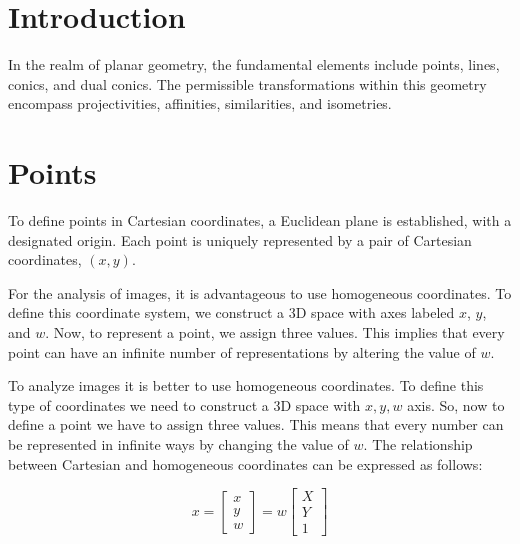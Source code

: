\documentclass[12pt, a4paper]{report}
\begin{document}
    \section{Introduction}
    In the realm of planar geometry, the fundamental elements include points, lines, conics, and dual conics. 
    The permissible transformations within this geometry encompass projectivities, affinities, similarities, and isometries.

    \section{Points}
    To define points in Cartesian coordinates, a Euclidean plane is established, with a designated origin. 
    Each point is uniquely represented by a pair of Cartesian coordinates, $(x, y)$.

    For the analysis of images, it is advantageous to use homogeneous coordinates.
    To define this coordinate system, we construct a 3D space with axes labeled $x$, $y$, and $w$. 
    Now, to represent a point, we assign three values. 
    This implies that every point can have an infinite number of representations by altering the value of $w$.

    To analyze images it is better to use homogeneous coordinates. To define this type of coordinates we need to construct a 3D space with $x,y,w$ axis. So, now to define a point
    we have to assign three values. This means that every number can be represented in infinite ways by changing the value of $w$. 
    The relationship between Cartesian and homogeneous coordinates can be expressed as follows:

    \[
    x=
    \begin{bmatrix}
        x \\
        y \\
        w 
    \end{bmatrix}
    =w
    \begin{bmatrix}
        X \\
        Y \\
        1 
    \end{bmatrix}
    \]
\end{document}

